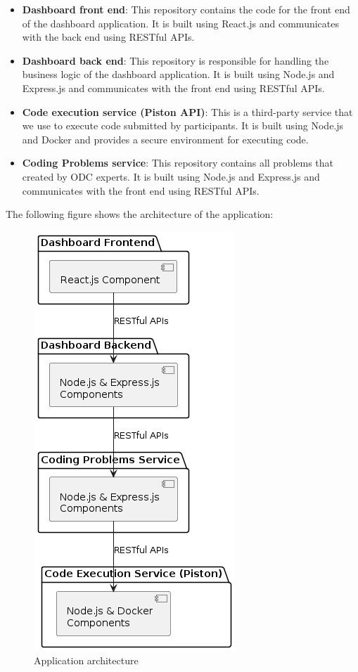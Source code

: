 \begin{itemize}
      \item \textbf{Dashboard front end}: This repository contains the code for the
            front end of the dashboard application. It is built using React.js and
            communicates with the back end using RESTful APIs.

      \item \textbf{Dashboard back end}: This repository is responsible for handling the
            business logic of the dashboard application. It is built using Node.js
            and Express.js and communicates with the front end using RESTful APIs.

      \item \textbf{Code execution service (Piston API)}: This is a third-party service
            that we use to execute code submitted by participants. It is built
            using Node.js and Docker and provides a secure environment for
            executing code.

      \item \textbf{Coding Problems service}: This repository contains all problems that created
            by ODC experts. It is built using Node.js and Express.js and communicates with
            the front end using RESTful APIs.
\end{itemize}

The following figure shows the architecture of the application:
\begin{figure}[h!]
      \centering
      \includegraphics[height=1\textwidth]{images/softwareArchitecture.png}
      \caption{Application architecture}
      \label{fig:architecture}
\end{figure}